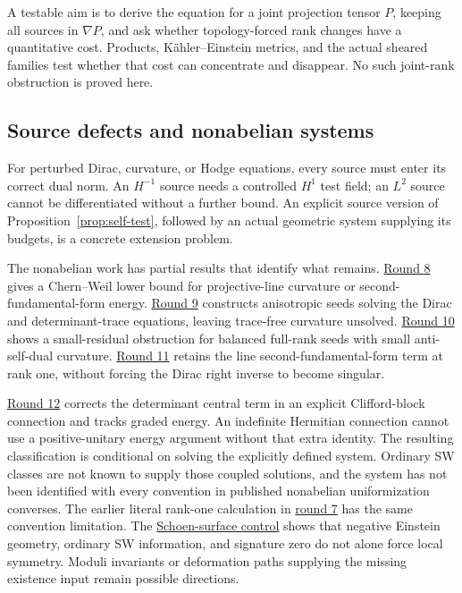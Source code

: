 \documentclass[11pt,a4paper]{article}
\theoremstyle{definition}
\theoremstyle{remark}
\newcommand{\roundref}[2]{\href{run:../references/rounds/#1}{#2}}
\numberwithin{equation}{section}
\begin{document}
A testable aim is to derive the equation for a joint projection tensor
$P$, keeping all sources in $\nabla P$, and ask whether topology-forced
rank changes have a quantitative cost. Products, K\"ahler--Einstein
metrics, and the actual sheared families test whether that cost can
concentrate and disappear. No such joint-rank obstruction is proved here.

\subsection{Source defects and nonabelian systems}\label{sub:sources-nonabelian}
For perturbed Dirac, curvature, or Hodge equations, every source must
enter its correct dual norm. An $H^{-1}$ source needs a controlled
$H^1$ test field; an $L^2$ source cannot be differentiated without a
further bound. An explicit source version of
Proposition~\ref{prop:self-test}, followed by an actual geometric system
supplying its budgets, is a concrete extension problem.

The nonabelian work has partial results that identify what remains.
\roundref{round8_nonabelian.md}{Round 8} gives a Chern--Weil lower bound
for projective-line curvature or second-fundamental-form energy.
\roundref{round9_nonabelian.md}{Round 9} constructs anisotropic seeds
solving the Dirac and determinant-trace equations, leaving trace-free
curvature unsolved. \roundref{round10_nonabelian.md}{Round 10} shows a
small-residual obstruction for balanced full-rank seeds with small
anti-self-dual curvature. \roundref{round11_rankone.md}{Round 11} retains
the line second-fundamental-form term at rank one, without forcing the
Dirac right inverse to become singular.

\roundref{round12_uniformization.md}{Round 12} corrects the determinant
central term in an explicit Clifford-block connection and tracks graded
energy. An indefinite Hermitian connection cannot use a positive-unitary
energy argument without that extra identity. The resulting classification
is conditional on solving the explicitly defined system. Ordinary SW
classes are not known to supply those coupled solutions, and the system
has not been identified with every convention in published nonabelian
uniformization converses. The earlier literal rank-one calculation in
\roundref{round7_rigidity.md}{round 7} has the same convention limitation.
The \roundref{round12_control.md}{Schoen-surface control} shows that
negative Einstein geometry, ordinary SW information, and signature zero
do not alone force local symmetry. Moduli invariants or deformation
paths supplying the missing existence input remain possible directions.
\end{document}
